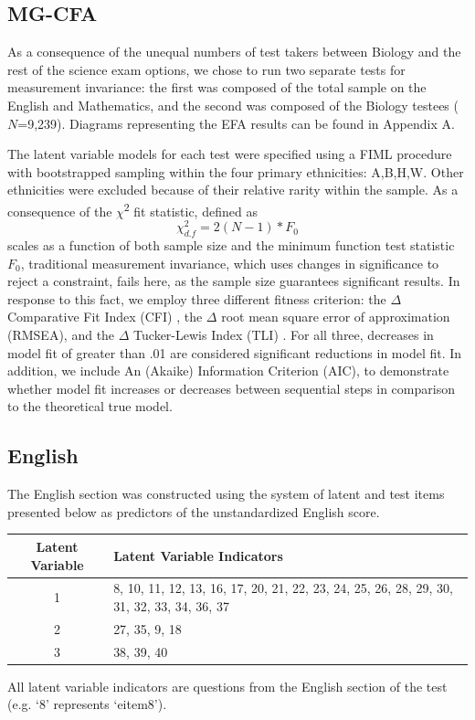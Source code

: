 \documentclass{article}\usepackage[]{graphicx}\usepackage[]{color}
\begin{document}
\subsection{MG-CFA}
As a consequence of the unequal numbers of test takers between Biology and the rest of the science exam options, we chose to run two separate tests for measurement invariance: the first was composed of the total sample on the English and Mathematics, and the second was composed of the Biology testees ($N$=9,239). Diagrams representing the EFA results can be found in Appendix A.

 The latent variable models for each test were specified using a FIML procedure with
bootstrapped sampling within the four primary ethnicities: A,B,H,W.
Other ethnicities were excluded because of their relative rarity within
the sample. As a consequence of the $\chi$\textsuperscript{2} fit
statistic, defined as \begin{equation} \chi^2_{d.f}=2(N-1) * F_0
\end{equation} scales as a function of both sample size and the minimum
function test statistic $F_0$, traditional measurement invariance, which
uses changes in significance to reject a constraint, fails here, as the
sample size guarantees significant results. In response to this fact, we
employ three different fitness criterion: the $\Delta$ Comparative Fit
Index (CFI) \cite{Bentler}, the $\Delta$ root mean square error of
approximation (RMSEA), and the $\Delta$ Tucker-Lewis Index (TLI)
\cite{Chen}. For all three, decreases in model fit of greater than .01
are considered significant reductions in model fit. In addition, we
include An (Akaike) Information Criterion (AIC), to demonstrate whether
model fit increases or decreases between sequential steps in comparison
to the theoretical true model.
\subsection{English}
The English section was constructed using the system of latent and test items presented below as predictors of the unstandardized English score.

\vspace{0.25cm}

\begin{minipage}{\linewidth}
\begin{tabular}{|c|l|}
\multicolumn{1}{c}{Latent Variable} & \multicolumn{1}{l}{Latent Variable Indicators}\tabularnewline
\hline 
1 & 8, 10, 11, 12, 13, 16, 17, 20,  21, 22, 23, 24, 25, 26, 28, 29,  30,
31, 32, 33, 34, 36, 37\tabularnewline
\hline 
2 & 27, 35, 9, 18\tabularnewline
\hline 
3 & 38, 39, 40\tabularnewline
\hline
\end{tabular}

\bigskip

All latent variable indicators are questions from the English section of the test (e.g. `8' represents `eitem8').

\end{minipage}
\end{document}
